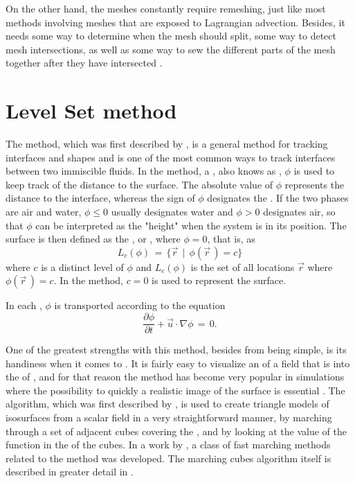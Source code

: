 On the other hand, the meshes constantly require remeshing, just like most methods involving meshes that are exposed to Lagrangian advection. Besides, it needs some way to determine when the mesh should split, some way to detect mesh intersections, as well as some way to sew the different parts of the mesh together after they have intersected \citep{Wojtan2009}.

\section{Level Set method}

The \LS method, which was first described by \citet{Osher1988}, is a general method for tracking interfaces and shapes and is one of the most common ways to track interfaces between two immiscible fluids. In the \LS method, a , also knows as , $\phi$ is used to keep track of the distance to the surface. The absolute value of $\phi$ represents the distance to the interface, whereas the sign of $\phi$ designates the \phase. If the two phases are air and water, $\phi \leq 0$ usually designates water and $\phi > 0$ designates air, so that $\phi$ can be interpreted as the "height" when the system is in its \equilibrium position. The surface is then defined as the \isosurface, or , where $\phi = 0$, that is, as
%
\begin{equation} \label{eq:level_set}
L_c(\phi) \,=\, \{\vec{r} \,\mid\, \phi(\vec{r}\,)=c\}
\end{equation}
%
where $c$ is a distinct level of $\phi$ and $L_c(\phi)$ is the set of all locations $\vec{r}$ where $\phi(\vec{r}\,) = c$. In the \LS method, $c = 0$ is used to represent the surface.

In each , $\phi$ is transported according to the equation
%
\begin{equation} \label{eq:level_set_function_transport}
\frac{\partial\phi}{\partial t} + \vec{u}\cdot\nabla\phi \,=\, 0.
\end{equation}

One of the greatest strengths with this method, besides from being simple, is its handiness when it comes to . It is fairly easy to visualize an \isosurface of a field that is \discretized into the \nodes of , and for that reason the \LS method has become very popular in \FVM simulations where the possibility to quickly \render a realistic image of the surface is essential \citep{Losasso2004,Chentanez2011}. The  algorithm, which was first described by \citet{Lorensen1987}, is used to create triangle models of isosurfaces from a scalar field in a very straightforward manner, by marching through a set of adjacent cubes covering the , and by looking at the value of the function in the  of the cubes. In a work by \citet{Sethian1995}, a class of fast marching methods related to the \LS method was developed. The marching cubes algorithm itself is described in greater detail in .

